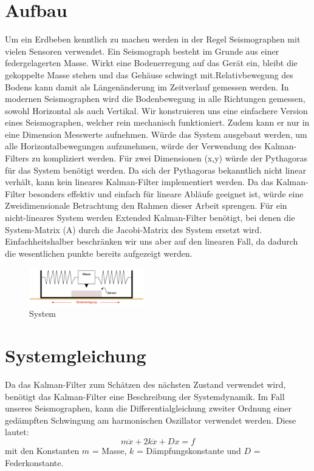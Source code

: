 \section{Aufbau}
Um ein Erdbeben kenntlich zu machen werden in der Regel Seismographen mit vielen Sensoren verwendet. 
Ein Seismograph besteht im Grunde aus einer federgelagerten Masse. Wirkt eine Bodenerregung auf das Gerät ein, bleibt die gekoppelte Masse stehen und das Gehäuse schwingt mit.Relativbewegung des Bodens kann damit als Längenänderung im Zeitverlauf gemessen werden. In modernen Seismographen wird die Bodenbewegung in alle Richtungen gemessen, sowohl Horizontal als auch Vertikal. 
Wir konstruieren uns eine einfachere Version eines Seismographen, welcher rein mechanisch funktioniert. Zudem kann er nur in eine Dimension Messwerte aufnehmen. Würde das System ausgebaut werden, um alle Horizontalbewegungen aufzunehmen, würde der Verwendung des Kalman-Filters zu kompliziert werden. Für zwei Dimensionen (x,y) würde der Pythagoras für das System benötigt werden. Da sich der Pythagoras bekanntlich nicht linear verhält, kann kein lineares Kalman-Filter implementiert werden. Da das Kalman-Filter besonders effektiv und einfach für lineare Abläufe geeignet ist, würde eine Zweidimensionale Betrachtung den Rahmen dieser Arbeit sprengen. Für ein nicht-lineares System werden Extended Kalman-Filter benötigt, bei denen die System-Matrix (A) durch die Jacobi-Matrix des System ersetzt wird. Einfachheitshalber beschränken wir uns aber auf den linearen Fall, da dadurch die wesentlichen punkte bereits aufgezeigt werden. 

\begin{figure}
 \begin{center}
 \includegraphics[width=5cm]{papers/erdbeben/Apperatur}
 \caption{System}
 \end{center}
\end{figure}



\section{Systemgleichung}
Da das Kalman-Filter zum Schätzen des nächsten Zustand verwendet wird, benötigt das Kalman-Filter eine Beschreibung der Systemdynamik. Im Fall unseres Seismographen, kann die Differentialgleichung zweiter Ordnung einer gedämpften Schwingung am harmonischen Oszillator verwendet werden. Diese lautet:
\begin{equation}
m\ddot x + 2k \dot x + Dx = f
\end{equation}
mit den Konstanten $m$ = Masse, $k$ = Dämpfungskonstante und $D$  = Federkonstante.

